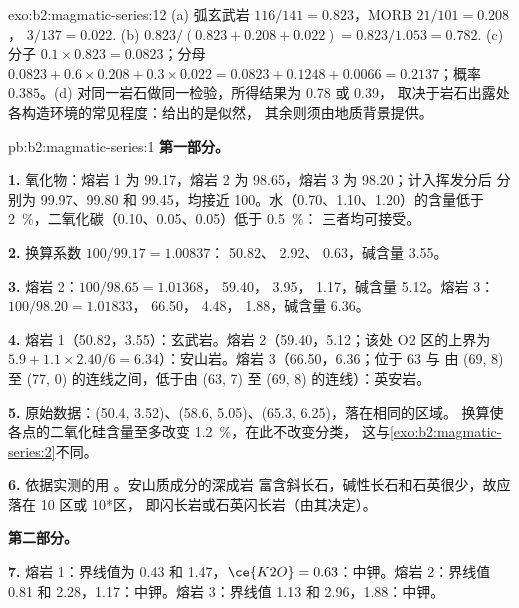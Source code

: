 \begin{solution}{exo:b2:magmatic-series:12}
(a) 弧玄武岩 $116/141 = 0.823$，MORB $21/101 = 0.208$，
$3/137 = 0.022$. (b) $0.823/(0.823 + 0.208 + 0.022) = 0.823/1.053 = 0.782$.
(c) 分子 $0.1\times0.823 = 0.0823$；分母 $0.0823 + 0.6\times0.208 +
0.3\times0.022 = 0.0823 + 0.1248 + 0.0066 = 0.2137$；概率 $0.385$。(d)
对同一岩石做同一检验，所得结果为 0.78 或 0.39，
取决于岩石出露处各构造环境的常见程度：给出的是似然，
其余则须由地质背景提供。
\end{solution}

\begin{solution}{pb:b2:magmatic-series:1}
\noindent\textbf{第一部分。}

\textbf{1.} 氧化物：熔岩 1 为 99.17，熔岩 2 为 98.65，熔岩 3 为 98.20；计入挥发分后
分别为 99.97、99.80 和 99.45，均接近 100。水（0.70、1.10、1.20）的含量低于
\qty{2}{\percent}，二氧化碳（0.10、0.05、0.05）低于 \qty{0.5}{\percent}：
三者均可接受。

\textbf{2.} 换算系数 $100/99.17 = 1.00837$： 50.82、 2.92、
0.63，碱含量 3.55。

\textbf{3.} 熔岩 2：$100/98.65 = 1.01368$， 59.40， 3.95，
1.17，碱含量 5.12。熔岩 3：$100/98.20 = 1.01833$， 66.50， 4.48，
 1.88，碱含量 6.36。

\textbf{4.} 熔岩 1（50.82，3.55）：玄武岩。熔岩 2（59.40，5.12；该处 O2 区的上界为
$5.9 + 1.1\times2.40/6 = 6.34$）：安山岩。熔岩 3（66.50，6.36；位于 63 与
由 (69, 8) 至 (77, 0) 的连线之间，低于由 (63, 7) 至 (69, 8) 的连线）：英安岩。

\textbf{5.} 原始数据：(50.4, 3.52)、(58.6, 5.05)、(65.3, 6.25)，落在相同的区域。
换算使各点的二氧化硅含量至多改变 \qty{1.2}{\percent}，在此不改变分类，
这与\cref{exo:b2:magmatic-series:2}不同。

\textbf{6.} 依据实测的用 。安山质成分的深成岩
富含斜长石，碱性长石和石英很少，故应落在 10 区或 10*区，
即闪长岩或石英闪长岩（由其决定）。

\noindent\textbf{第二部分。}

\textbf{7.} 熔岩 1：界线值为 0.43 和 1.47，$\ce{K2O} = 0.63$：中钾。熔岩 2：界线值 0.81
和 2.28，1.17：中钾。熔岩 3：界线值 1.13 和 2.96，1.88：中钾。


\end{solution}
